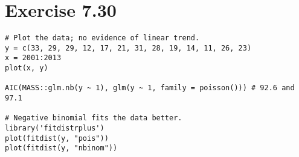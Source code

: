 \section*{Exercise 7.30}
\begin{lstlisting}
# Plot the data; no evidence of linear trend.
y = c(33, 29, 29, 12, 17, 21, 31, 28, 19, 14, 11, 26, 23)
x = 2001:2013
plot(x, y)

AIC(MASS::glm.nb(y ~ 1), glm(y ~ 1, family = poisson())) # 92.6 and 97.1

# Negative binomial fits the data better.
library('fitdistrplus')
plot(fitdist(y, "pois"))  
plot(fitdist(y, "nbinom"))
\end{lstlisting}